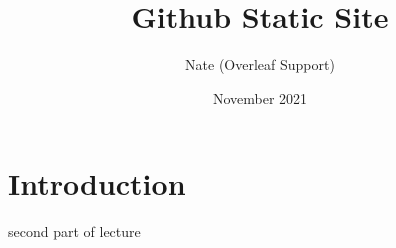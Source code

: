 \documentclass{article}
\title{Github Static Site}
\author{Nate (Overleaf Support)}
\date{November 2021}
\begin{document}
\maketitle

\section{Introduction}

second part of lecture
\end{document}
